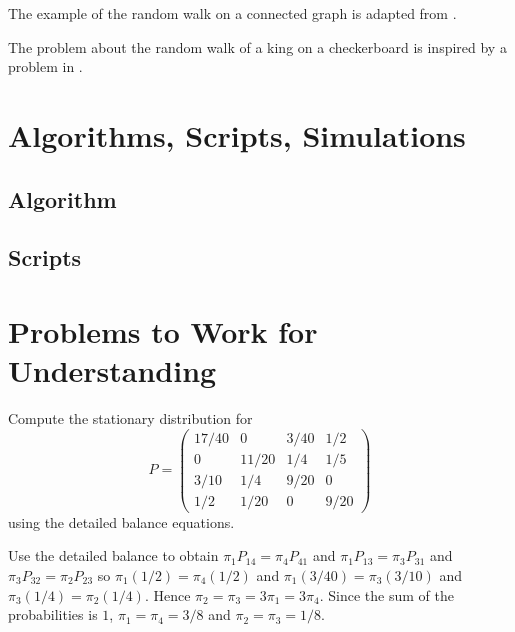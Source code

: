 \documentclass[12pt]{article}
\begin{document}
The example of the random walk on a connected graph is adapted from 
.

The problem about the random walk of a king on a checkerboard is
inspired by a problem in 
.

\nocite{}
\nocite{}

\hr

\section*{Algorithms, Scripts, Simulations}

\subsection*{Algorithm}

\subsection*{Scripts}



\hr

\section*{Problems to Work for Understanding}
\renewcommand{\theexerciseseries}{}
\renewcommand{\theexercise}{\arabic{exercise}}

\begin{exercise}
  Compute the stationary distribution for
  \[
    P =
    \begin{pmatrix}
      17/40 & 0 & 3/40 & 1/2 \\
      0     & 11/20 & 1/4 & 1/5 \\
      3/10  & 1/4   & 9/20 & 0 \\
      1/2   & 1/20  & 0    & 9/20
    \end{pmatrix}
  \]
  using the detailed balance equations.
\end{exercise}
\begin{solution}
  Use the detailed balance to obtain $\pi_1P_{14} = \pi_4P_{41}$ and $\pi_1P_{13} = \pi_3P_{31}$
and $\pi_3P_{32} = \pi_2P_{23}$ so $\pi_1(1/2) = \pi_4(1/2)$ and $\pi_1(3/40) = \pi_3(3/10)$ and $\pi_3(1/4) = \pi_2(1/4)$.
Hence $\pi_2 = \pi_3 = 3\pi_1 = 3\pi_4$. Since the sum of the probabilities is $1$,
$\pi_1 = \pi_4 = 3/8$ and $\pi_2 = \pi_3 = 1/8$.
\end{solution}
\end{document}
